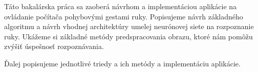 Táto bakalárska práca sa zaoberá návrhom a implementáciou aplikácie na ovládanie počítača pohybovými gestami ruky. Popisujeme návrh základného algoritmu a návrh vhodnej architektúry umelej neurónovej siete na rozpoznanie ruky. Ukážeme si základné metódy predspracovania obrazu, ktoré nám pomôžu zvýšiť úspešnosť rozpoznávania. 

Ďalej popisujeme jednotlivé triedy a ich metódy a implementáciu aplikácie.